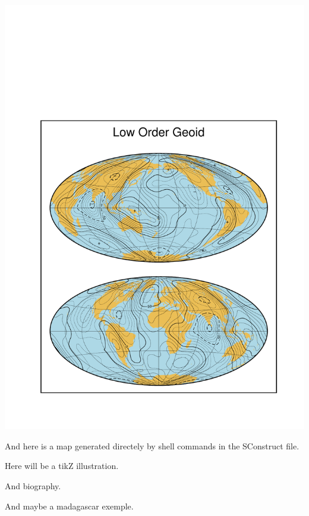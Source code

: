 \documentclass[11pt,a4paper]{article}
\begin{document}
\includegraphics[scale=0.5]{fig/map1.pdf}

And here is a map generated directely by shell commands in the SConstruct file. 


Here will be a tikZ illustration. 

And biography. 

And maybe a madagascar exemple. 
\end{document}
